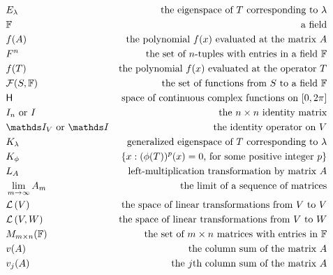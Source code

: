 \begin{align*}
	 & E_\lambda              & \text{the eigenspace of $T$ corresponding to $\lambda$}               \\
	 & \F                     & \text{a field}                                                        \\
	 & f(A)                   & \text{the polynomial $f(x)$ evaluated at the matrix $A$}              \\
	 & F^n                    & \text{the set of $n$-tuples with entries in a field $\F$}             \\
	 & f(T)                   & \text{the polynomial $f(x)$ evaluated at the operator $T$}            \\
	 & \mathcal{F}(S,\F)      & \text{the set of functions from $S$ to a field $\F$}                  \\
	 & \mathsf{H}             & \text{space of continuous complex functions on $[0, 2\pi]$}           \\
	 & I_n \text{ or } I      & \text{the $n \times n$ identity matrix}                               \\
	 & \Id_V \text{ or } \Id  & \text{the identity operator on $V$}                                   \\
	 & K_\lambda              & \text{generalized eigenspace of $T$ corresponding to $\lambda$}       \\
	 & K_\phi                 & \{x : (\phi(T))^p(x) = 0 \text{, for some positive integer $p$}\}     \\
	 & L_A                    & \text{left-multiplication transformation by matrix $A$}               \\
	 & \lim_{m \to \infty}A_m & \text{the limit of a sequence of matrices}                            \\
	 & \linear{V}             & \text{the space of linear transformations from $V$ to $V$}            \\
	 & \linear{V, W}          & \text{the space of linear transformations from $V$ to $W$}            \\
	 & M_{m \times n}(\F)     & \text{the set of $m \times n$ matrices with entries in $\F$}          \\
	 & v(A)                   & \text{the column sum of the matrix $A$}                               \\
	 & v_j(A)                 & \text{the $j$th column sum of the matrix $A$}                         \\

\end{align*}
